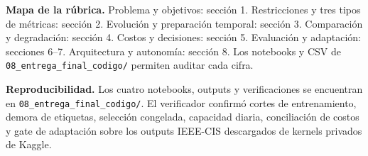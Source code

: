 \documentclass[11pt,letterpaper]{article}
\begin{document}
\textbf{Mapa de la rúbrica.} Problema y objetivos: sección 1. Restricciones y tres tipos de métricas: sección 2. Evolución y preparación temporal: sección 3. Comparación y degradación: sección 4. Costos y decisiones: sección 5. Evaluación y adaptación: secciones 6--7. Arquitectura y autonomía: sección 8. Los notebooks y CSV de \texttt{08\_entrega\_final\_codigo/} permiten auditar cada cifra.

\textbf{Reproducibilidad.} Los cuatro notebooks, outputs y verificaciones se encuentran en \texttt{08\_entrega\_final\_codigo/}. El verificador confirmó cortes de entrenamiento, demora de etiquetas, selección congelada, capacidad diaria, conciliación de costos y gate de adaptación sobre los outputs IEEE-CIS descargados de kernels privados de Kaggle.
\end{document}
